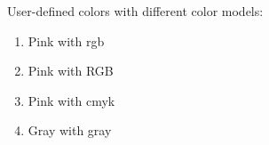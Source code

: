 \documentclass{article}
\begin{document}
User-defined colors with different color models:

\begin{enumerate}
\item \textcolor{mypink1}{Pink with rgb}
\item \textcolor{mypink2}{Pink with RGB}
\item \textcolor{mypink3}{Pink with cmyk}
\item \textcolor{mygray}{Gray with gray}
\end{enumerate}
\end{document}
